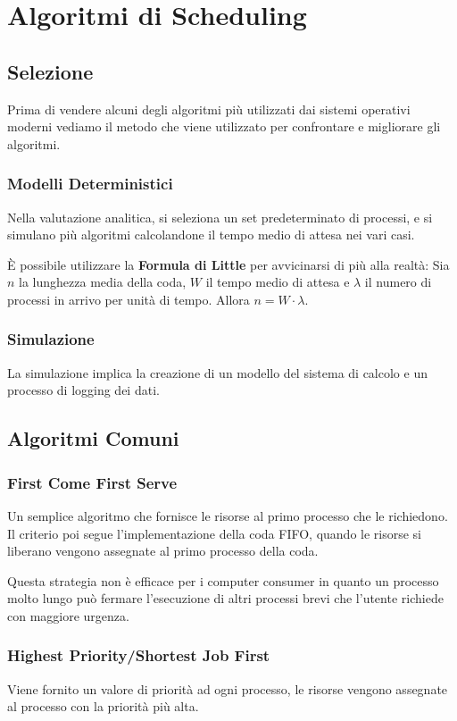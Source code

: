 \section{Algoritmi di Scheduling}

\subsection{Selezione}
Prima di vendere alcuni degli algoritmi più utilizzati dai sistemi operativi moderni vediamo il metodo che viene utilizzato per confrontare e migliorare gli algoritmi.

\subsubsection{Modelli Deterministici}
Nella valutazione analitica, si seleziona un set predeterminato di processi, e si simulano più algoritmi calcolandone il tempo medio di attesa nei vari casi.

\spacer
È possibile utilizzare la \textbf{Formula di Little} per avvicinarsi di più alla realtà:
Sia $n$ la lunghezza media della coda, $W$ il tempo medio di attesa e $\lambda$ il numero di processi in arrivo per unità di tempo. Allora $n = W \cdot \lambda$.

\subsubsection{Simulazione}
La simulazione implica la creazione di un modello del sistema di calcolo e un processo di logging dei dati.

\subsection{Algoritmi Comuni}

\subsubsection{First Come First Serve}
Un semplice algoritmo che fornisce le risorse al primo processo che le richiedono. Il criterio poi segue l'implementazione della coda FIFO, quando le risorse si liberano vengono assegnate al primo processo della coda.

Questa strategia non è efficace per i computer consumer in quanto un processo molto lungo può fermare l'esecuzione di altri processi brevi che l'utente richiede con maggiore urgenza.

\subsubsection{Highest Priority/Shortest Job First}
Viene fornito un valore di priorità ad ogni processo, le risorse vengono assegnate al processo con la priorità più alta.

